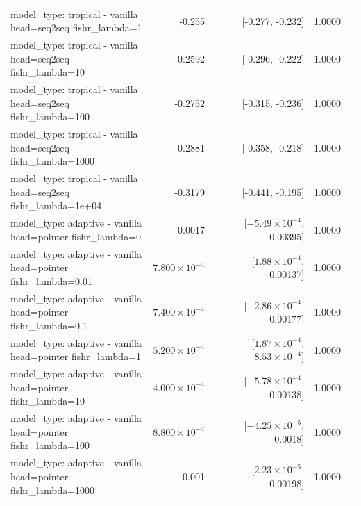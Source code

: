 \documentclass[10pt]{article}
\makeatletter
\newcommand{\stackcell}[1]{\begin{tabular}[t]{@{}l@{}}#1\end{tabular}}
\makeatother
\begin{document}
{\begin{longtable}{lrrrl}
\stackcell{model\_type: tropical - vanilla\\\footnotesize head=seq2seq fishr\_lambda=1 } & -0.255 & [-0.277, -0.232] & 1.0000 & \\
\stackcell{model\_type: tropical - vanilla\\\footnotesize head=seq2seq fishr\_lambda=10 } & -0.2592 & [-0.296, -0.222] & 1.0000 & \\
\stackcell{model\_type: tropical - vanilla\\\footnotesize head=seq2seq fishr\_lambda=100 } & -0.2752 & [-0.315, -0.236] & 1.0000 & \\
\stackcell{model\_type: tropical - vanilla\\\footnotesize head=seq2seq fishr\_lambda=1000 } & -0.2881 & [-0.358, -0.218] & 1.0000 & \\
\stackcell{model\_type: tropical - vanilla\\\footnotesize head=seq2seq fishr\_lambda=1e+04 } & -0.3179 & [-0.441, -0.195] & 1.0000 & \\
\stackcell{model\_type: adaptive - vanilla\\\footnotesize head=pointer fishr\_lambda=0 } & 0.0017 & [$-5.49\times10^{-4}$, 0.00395] & 1.0000 & \\
\stackcell{model\_type: adaptive - vanilla\\\footnotesize head=pointer fishr\_lambda=0.01 } & $7.800\times10^{-4}$ & [$1.88\times10^{-4}$, 0.00137] & 1.0000 & \\
\stackcell{model\_type: adaptive - vanilla\\\footnotesize head=pointer fishr\_lambda=0.1 } & $7.400\times10^{-4}$ & [$-2.86\times10^{-4}$, 0.00177] & 1.0000 & \\
\stackcell{model\_type: adaptive - vanilla\\\footnotesize head=pointer fishr\_lambda=1 } & $5.200\times10^{-4}$ & [$1.87\times10^{-4}$, $8.53\times10^{-4}$] & 1.0000 & \\
\stackcell{model\_type: adaptive - vanilla\\\footnotesize head=pointer fishr\_lambda=10 } & $4.000\times10^{-4}$ & [$-5.78\times10^{-4}$, 0.00138] & 1.0000 & \\
\stackcell{model\_type: adaptive - vanilla\\\footnotesize head=pointer fishr\_lambda=100 } & $8.800\times10^{-4}$ & [$-4.25\times10^{-5}$, 0.0018] & 1.0000 & \\
\stackcell{model\_type: adaptive - vanilla\\\footnotesize head=pointer fishr\_lambda=1000 } & 0.001 & [$2.23\times10^{-5}$, 0.00198] & 1.0000 & \\

\end{longtable}}
\end{document}
